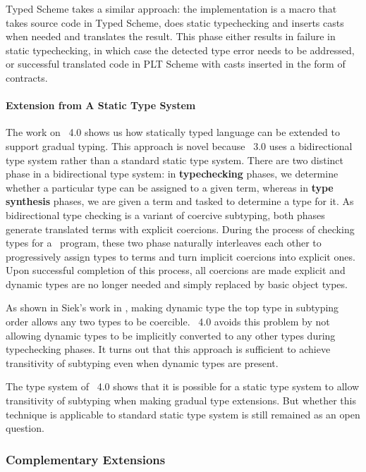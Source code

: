 Typed Scheme takes a similar approach: the implementation is a macro
that takes source code in Typed Scheme, does static typechecking and
inserts casts when needed and translates the result.
This phase either results in failure in static typechecking, in
which case the detected type error needs to be addressed,
or successful translated code in PLT Scheme with casts inserted
in the form of contracts.

\paragraph{Extension from A Static Type System}

The work on \csharp\ 4.0 shows us how statically typed language can be extended
to support gradual typing.
This approach is novel because \csharp\ 3.0 uses a bidirectional type system \cite{pierce2000local}
rather than a standard static type system.
There are two distinct phase in a bidirectional type system:
in \textbf{typechecking} phases, we determine whether a particular type can be
assigned to a given term, whereas in \textbf{type synthesis} phases,
we are given a term and tasked to determine a type for it.
As bidirectional type checking is a variant of coercive subtyping\cite{breazu1991inheritance},
both phases generate translated terms with explicit coercions.
During the process of checking types for a \csharp\ program,
these two phase naturally interleaves each other to progressively
assign types to terms and turn implicit coercions into explicit ones.
Upon successful completion of this process, all coercions are made
explicit and dynamic types are no longer needed and simply replaced by basic object types.

As shown in Siek's work in \cite{siek2007gradual},
making dynamic type the top type in subtyping order allows any two types to
be coercible. \csharp\ 4.0 avoids this problem by
not allowing dynamic types to be implicitly converted to any other types
during typechecking phases.
It turns out that this approach is sufficient to achieve
transitivity of subtyping
even when dynamic types are present.

The type system of \csharp\ 4.0 shows that it is possible for a
static type system to allow transitivity of subtyping when making gradual type extensions.
But whether this technique is applicable to standard static type system is still remained
as an open question.

\subsubsection{Complementary Extensions}


